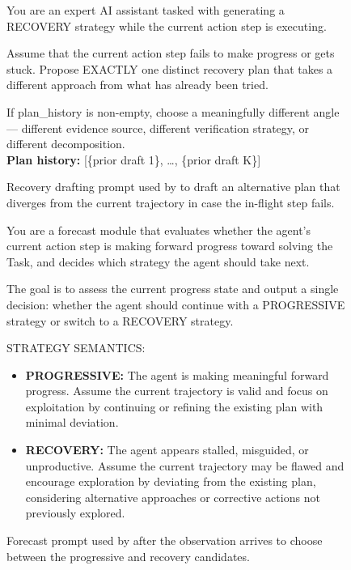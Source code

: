 \begin{figure}[H]
\begin{tcolorbox}[colback=gray!5, colframe=black!60, title=Recovery drafting prompt, fontupper=\small, width=\linewidth]
You are an expert AI assistant tasked with generating a RECOVERY strategy while the current action step is executing.

Assume that the current action step fails to make progress or gets stuck.
Propose EXACTLY one distinct recovery plan that takes a different approach from what has already been tried.

If plan\_history is non-empty, choose a meaningfully different angle --- different evidence source, different verification strategy, or different decomposition. \\[2pt]
\textbf{Plan history:} [\{prior draft 1\}, \ldots, \{prior draft K\}]
\end{tcolorbox}
\caption{Recovery drafting prompt used by \methodname to draft an alternative plan that diverges from the current trajectory in case the in-flight step fails.}
\label{fig:prompt_recovery}
\end{figure}

\begin{figure}[H]
\begin{tcolorbox}[colback=gray!5, colframe=black!60, title=Forecast prompt, fontupper=\small, width=\linewidth]
You are a forecast module that evaluates whether the agent's current action step is making forward progress toward solving the Task, and decides which strategy the agent should take next.

The goal is to assess the current progress state and output a single decision: whether the agent should continue with a PROGRESSIVE strategy or switch to a RECOVERY strategy.

STRATEGY SEMANTICS:
\begin{itemize}
\item \textbf{PROGRESSIVE:} The agent is making meaningful forward progress. Assume the current trajectory is valid and focus on exploitation by continuing or refining the existing plan with minimal deviation.
\item \textbf{RECOVERY:} The agent appears stalled, misguided, or unproductive. Assume the current trajectory may be flawed and encourage exploration by deviating from the existing plan, considering alternative approaches or corrective actions not previously explored.
\end{itemize}
\end{tcolorbox}
\caption{Forecast prompt used by \methodname after the observation arrives to choose between the progressive and recovery candidates.}
\label{fig:prompt_forecast}
\end{figure}

